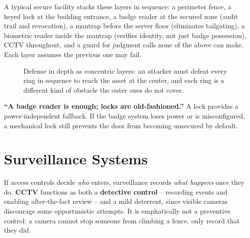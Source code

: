 A typical secure facility stacks these layers in sequence: a perimeter fence, a keyed lock at the
building entrance, a badge reader at the secured zone (audit trail and revocation), a mantrap
before the server floor (eliminates tailgating), a biometric reader inside the mantrap (verifies
identity, not just badge possession), CCTV throughout, and a guard for judgment calls none of the
above can make. Each layer assumes the previous one may fail.

\begin{figure}[h]
\centering
{}
\caption{Defense in depth as concentric layers: an attacker must defeat every ring in sequence to
reach the asset at the center, and each ring is a different kind of obstacle the outer ones do not
cover.}
\label{fig:2.3-defense-in-depth}
\end{figure}

\begin{misconception}
\textbf{``A badge reader is enough; locks are old-fashioned.''} A lock provides a power-independent
fallback. If the badge system loses power or is misconfigured, a mechanical lock still prevents
the door from becoming unsecured by default.
\end{misconception}

\section{Surveillance Systems}

If access controls decide \emph{who} enters, surveillance records \emph{what happens} once they
do. \textbf{CCTV} functions as both a \textbf{detective control} -- recording events and enabling
after-the-fact review -- and a mild deterrent, since visible cameras discourage some opportunistic
attempts. It is emphatically not a preventive control: a camera cannot stop someone from climbing
a fence, only record that they did.

